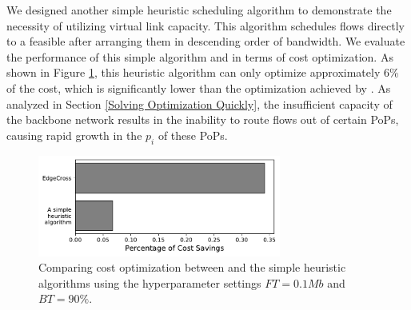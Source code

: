  We designed another simple heuristic scheduling algorithm to demonstrate the necessity of utilizing virtual link capacity. This algorithm schedules flows directly to a feasible {\egress} after arranging them in descending order of bandwidth. We evaluate the performance of this simple algorithm and {\sys} in terms of cost optimization. As shown in Figure \ref{fig:backboneEffect}, this heuristic algorithm can only optimize approximately 6\% of the cost, which is significantly lower than the optimization achieved by {\sys}. As analyzed in Section \ref{Solving Optimization Quickly}, the insufficient capacity of the backbone network results in the inability to route flows out of certain PoPs, causing rapid growth in the {\egress} $p_i$ of these PoPs.

\begin{figure}
	\centering
	\includegraphics[width = 8cm]{figs/evaluation/backboneEffect.pdf}
	\caption{\small Comparing cost optimization between {\sys} and the simple heuristic algorithms using the hyperparameter settings $FT=0.1Mb$ and $BT=90\%$.}
	\label{fig:backboneEffect}
\end{figure}





